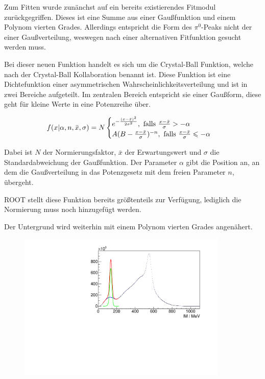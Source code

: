 \documentclass[a4paper,11pt,oneside,final,german,openbib,pdftex]{scrbook}
\begin{document}
{Zum Fitten wurde zun\"anchst auf ein bereits existierendes Fitmodul zur\"uckgegriffen. Dieses ist eine Summe aus einer Gau{\ss}funktion und einem Polynom vierten Grades. Allerdings entspricht die Form des $\pi^0$-Peaks nicht der einer Gau{\ss}verteilung, weswegen nach einer alternativen Fitfunktion gesucht werden muss. 

Bei dieser neuen Funktion handelt es sich um die Crystal-Ball Funktion, welche nach der Crystal-Ball Kollaboration benannt ist. Diese Funktion ist eine Dichtefunktion einer asymmetrischen Wahrscheinlichkeitsverteilung und ist in zwei Bereiche aufgeteilt. Im zentralen Bereich entspricht sie einer Gau{\ss}form, diese geht f\"ur kleine Werte in eine Potenzreihe \"uber.

\begin{equation}
f(x|\alpha,n,\bar{x},\sigma)=N\begin{cases}e^{-\frac{(x-\bar{x})^2}{2\sigma^2}}, \textnormal{  falls $\frac{x-\bar{x}}{\sigma}> -\alpha$} \\
A(B-\frac{x-\bar{x}}{\sigma})^{-n}, \textnormal{  falls $\frac{x-\bar{x}}{\sigma}\leqslant -\alpha$} 
\end{cases}
\label{eq:Crystal-Ball-Funktion}
\end{equation}

Dabei ist $N$ der Normierungsfaktor, $\bar{x}$ der Erwartungswert und $\sigma$ die Standardabweichung der Gau{\ss}funktion. Der Parameter $\alpha$ gibt die Position an, an dem die Gau{\ss}verteilung in das Potenzgesetz mit dem freien Parameter $n$, \"ubergeht\cite{Ce15}.

ROOT stellt diese Funktion bereits gr\"o{\ss}tenteils zur Verf\"ugung, lediglich die Normierung muss noch hinzugef\"ugt werden.

Der Untergrund wird weiterhin mit einem Polynom vierten Grades angen\"ahert.

\begin{figure}[h!]
	\begin{center}
		\includegraphics[width=100mm]{NewCalib/Strahlzeit2014/20171904RealIntervalFitExample}
		

\end{center}
\end{figure}}
\end{document}
